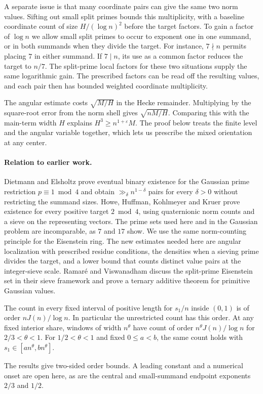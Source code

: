A separate issue is that many coordinate pairs can give the same
two norm values. Sifting out small split primes bounds this
multiplicity, with a baseline coordinate count of size
\(H/(\log n)^2\) before the target factors. To gain a factor of \(\log n\)
we allow small split primes to occur to exponent one in one
summand, or in both summands when they divide the target.
For instance, \(7\nmid n\) permits placing \(7\) in either summand.
If \(7\mid n\), its use as a common factor reduces the target to
\(n/7\). The split-prime local factors for these two situations
supply the same logarithmic gain. The prescribed factors can
be read off the resulting values, and each pair then has bounded
weighted coordinate multiplicity.

The angular estimate costs \(\sqrt{M/H}\) in the Hecke remainder.
Multiplying by the square-root error from the norm shell gives
\(\sqrt{nM/H}\). Comparing this with the main-term width \(H\)
explains \(H^3\ge n^{1+\varepsilon}M\). The proof below treats
the finite level and the angular variable together, which lets
us prescribe the mixed orientation at any center.

\paragraph{Relation to earlier work.}
Dietmann and Elsholtz \cite{DietmannElsholtz} prove eventual
binary existence for the Gaussian prime restriction \(p\equiv1\bmod4\)
and obtain \(\gg_\delta n^{1-\delta}\) pairs for every \(\delta>0\)
without restricting the summand sizes. Howe, Huffman, Kohlmeyer and
Kruer \cite[Theorem~1.1]{Euler} prove existence for every positive
target \(2\bmod4\), using quaternionic norm counts and a sieve on the
representing vectors. The prime sets used here and in the Gaussian
problem are incomparable, as \(7\) and \(17\) show.
We use the same norm-counting principle for the Eisenstein ring.
The new estimates needed here are angular localization with prescribed
residue conditions, the densities when a sieving prime divides the
target, and a lower bound that counts distinct value pairs at the
integer-sieve scale. Ramar\'e and Viswanadham
\cite[Introduction and Theorem~1.6]{RV} discuss the split-prime
Eisenstein set in their sieve framework and prove a ternary
additive theorem for primitive Gaussian values.

\begin{corollary}\label{cor:ranges}
The count in every fixed interval of positive length for \(s_1/n\)
inside \((0,1)\) is of order \(nJ(n)/\log n\). In particular the
unrestricted count has this order. At any fixed interior share,
windows of width \(n^\theta\) have count of order
\(n^\theta J(n)/\log n\) for \(2/3<\theta<1\).
For \(1/2<\theta<1\) and fixed \(0\le a<b\), the same count holds
with \(s_1\in[a n^\theta,b n^\theta]\).
\end{corollary}

The results give two-sided order bounds. A leading constant and
a numerical onset are open here, as are the central and
small-summand endpoint exponents \(2/3\) and \(1/2\).
